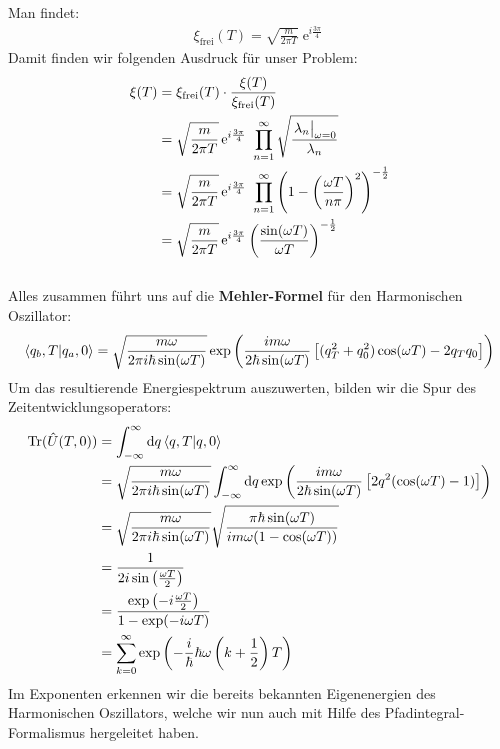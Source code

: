Man findet:
\begin{align}
\xi_{\text{frei}}(T) = \sqrt{\frac{m}{2\pi T}}\operatorname{e}^{i\frac{3\pi}{4}} 	
 \end{align} 
 Damit finden wir folgenden Ausdruck für unser Problem:
 \begin{align}
 	\xi(T) &= \xi_{\text{frei}}(T)\cdot\frac{\xi(T)}{\xi_{\text{frei}}(T)} \nonumber \\
 	&= \sqrt{\frac{m}{2\pi T}}\operatorname{e}^{i\frac{3\pi}{4}} \  \prod_{n=1}^{\infty}\sqrt{\frac{\eval{\lambda_n}_{\omega=0}}{\lambda_n}} \nonumber \\
 	&= \sqrt{\frac{m}{2\pi T}}\operatorname{e}^{i\frac{3\pi}{4}} \  \prod_{n=1}^{\infty} \left(1-\left(\frac{\omega T}{n\pi}\right)^2\right)^{-\frac{1}{2}} \nonumber \\
 	&= \sqrt{\frac{m}{2\pi T}}\operatorname{e}^{i\frac{3\pi}{4}} \left(\frac{\sin(\omega T)}{\omega T}\right)^{-\frac{1}{2}}
 \end{align}
 \\
 Alles zusammen führt uns auf die \textbf{Mehler-Formel} für den Harmonischen Oszillator:
 \begin{align}
 	\braket{q_b,T}{q_a,0}= \sqrt{\frac{m\omega}{2\pi i\hbar \sin(\omega T)}} \exp\left(\frac{i m\omega}{2\hbar\sin(\omega T)}\left[(q_T^2+q_0^2)\cos(\omega T)- 2q_Tq_0\right] \right)
 \end{align}
 Um das resultierende Energiespektrum auszuwerten, bilden wir die Spur des Zeitentwicklungsoperators: 
 \begin{align}
 	\operatorname{Tr}(\hat{U}(T,0)) &= \int_{-\infty}^{\infty} \dd q \braket{q,T}{q,0} \nonumber	\\
&=  \sqrt{\frac{m\omega}{2\pi i \hbar\sin(\omega T)}} \int_{-\infty}^{\infty} \dd q  \exp\left(\frac{i m\omega}{2\hbar\sin(\omega T)}\left[2q^2(\cos(\omega T)- 1)\right] \right) \nonumber\\
&= \sqrt{\frac{m\omega}{2\pi i \hbar\sin(\omega T)}}\sqrt{\frac{\pi\hbar\sin(\omega T)}{i m \omega(1-\cos(\omega T))}}\nonumber\\
&= \frac{1}{2 i \sin\left(\frac{\omega T}{2}\right)} \nonumber\\
&= \frac{\exp\left(- i \frac{\omega T}{2}\right)}{1-\exp(-i\omega T)}	\nonumber\\
&= \sum_{k=0}^{\infty} \exp\left(-\frac{i}{\hbar}\hbar\omega\left(k+\frac{1}{2}\right)T\right)
 \end{align}
 Im Exponenten erkennen wir die bereits bekannten Eigenenergien des Harmonischen Oszillators, welche wir nun auch mit Hilfe des Pfadintegral-Formalismus hergeleitet haben.